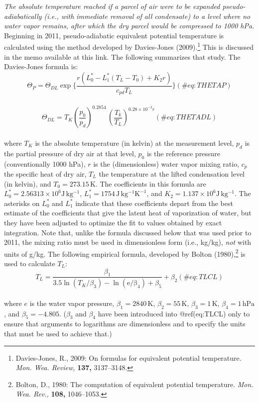 \documentclass[
  english,
]{book}
\begin{document}
\emph{The absolute temperature reached if a parcel of air were to be
expanded pseudo-adiabatically (i.e., with immediate removal of all
condensate) to a level where no water vapor remains, after which the dry
parcel would be compressed to 1000 hPa.} Beginning in 2011,
pseudo-adiabatic equivalent potential temperature is calculated using
the method developed by Davies-Jones (2009).\footnote{Davies-Jones, R.,
  2009: On formulas for equivalent potential temperature. \emph{Mon.
  Wea. Review,} \textbf{137,} 3137--3148.} This is discussed in the memo
available at this link. The following summarizes that study. The
Davies-Jones formula is:\\
\begin{equation}
\Theta_{P}=\Theta_{DL}\exp\{\frac{r(L_{0}^{*}-L_{1}^{*}(T_{L}-T_{0})+K_{2}r)}{c_{pd}T_{L}}\}
(\#eq:THETAP)
\end{equation}\\
\begin{equation}
\Theta_{DL}=T_{K}(\frac{p_{0}}{p_{d}})^{0.2854}\,(\frac{T_{k}}{T_{L}})^{0.28\times10^{-3}r}
(\#eq:THETADL)
\end{equation}\\
where \(T_K\) is the absolute temperature (in kelvin) at the measurement
level, \(p_d\) is the partial pressure of dry air at that level, \(p_0\)
is the reference pressure (conventionally 1000 hPa), \(r\) is the
(dimensionless) water vapor mixing ratio, \(c_p\) the specific heat of
dry air, \(T_L\) the temperature at the lifted condensation level (in
kelvin), and \(T_0=273.15\,\mathrm{K}\). The coefficients in this
formula are \(L_0^* = 2.56313\times 10^6\mathrm{J\,kg^{-1}}\),
\(L_1^* = 1754\,\mathrm{J\,kg^{-1}K^{-1}}\), and
\(K_2 = 1.137\times 10^6\mathrm{J\,kg^{-1}}\). The asterisks on
\(L_0^*\) and \(L_1^*\) indicate that these coefficients depart from the
best estimate of the coefficients that give the latent heat of
vaporization of water, but they have been adjusted to optimize the fit
to values obtained by exact integration. Note that, unlike the formula
discussed below that was used prior to 2011, the mixing ratio must be
used in dimensionless form (i.e., kg/kg), \emph{not} with units of g/kg.
The following empirical formula, developed by Bolton (1980),\footnote{Bolton,
  D., 1980: The computation of equivalent potential temperature.
  \emph{Mon. Wea. Rev.,} \textbf{108,} 1046--1053.} is used to calculate
\(T_L\):\\
\begin{equation}
T_{L}=\frac{\beta_{1}}{3.5\ln(T_{K}/\beta_{3})-\ln(\mathrm{e/\beta_{4}})+\beta_{5}}+\beta_{2}
(\#eq:TLCL)
\end{equation}\\
where \(e\) is the water vapor pressure, \(\beta_1 = 2840\,\mathrm{K}\),
\(\beta_2 = 55\,\mathrm{K}\), \(\beta_3 = 1\,\mathrm{K}\),
\(\beta_4 = 1\,\mathrm{hPa}\), and \(\beta_5 = -4.805\). (\(\beta_3\)
and \(\beta_4\) have been introduced into @ref(eq:TLCL) only to ensure
that arguments to logarithms are dimensionless and to specify the units
that must be used to achieve that.)
\end{document}
